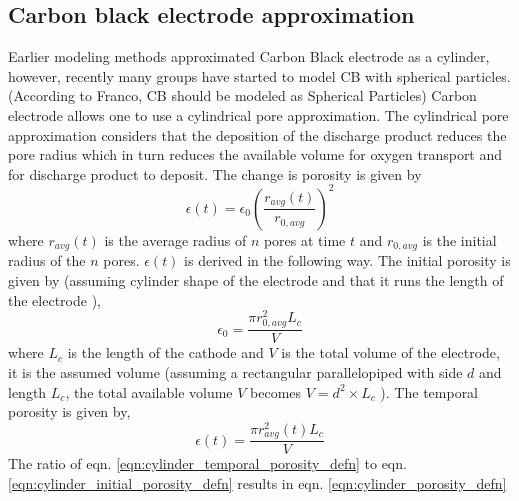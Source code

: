 \documentclass[12pt]{book}
\begin{document}
\subsection{Carbon black electrode approximation} Earlier modeling methods approximated Carbon Black electrode as a cylinder, however, recently many groups have started to model CB with spherical particles. \cite{Vamsci2014,Franco2013a}  (According to Franco, CB should be modeled as Spherical Particles) Carbon electrode allows one to use a cylindrical pore approximation. The cylindrical pore approximation considers that the deposition of the discharge product reduces the pore radius which in turn reduces the available volume for oxygen transport and for discharge product to deposit. The change is porosity is given by 
\begin{equation}
\epsilon\left(t\right)=\epsilon_0\left(\frac{r_{avg}\left(t\right)}{r_{0,avg}}\right)^2
\label{eqn:cylinder_porosity_defn}
\end{equation}
where $r_{avg}\left(t\right)$ is the average radius of $n$ pores at time $t$ and $r_{0,avg}$ is the initial radius of the $n$ pores. $\epsilon\left(t\right)$ is derived in the following way. The initial porosity is given by (assuming cylinder shape of the electrode and that it runs the length of the electrode ),
\begin{equation}
\epsilon_0 =\frac{\pi r^2_{0,avg}L_c}{V}
\label{eqn:cylinder_initial_porosity_defn}
\end{equation}
where $L_c$ is the length of the cathode and $V$ is the total volume of the electrode, it is the assumed volume (assuming a rectangular parallelopiped with side $d$ and length $L_c$, the total available volume $V$ becomes  $V=d^2\times L_c$ ).  The temporal porosity is given by,
\begin{equation}
\epsilon\left(t\right) =\frac{\pi r^2_{avg}\left(t\right)L_c}{V}
\label{eqn:cylinder_temporal_porosity_defn}
\end{equation}
The ratio of eqn. \ref{eqn:cylinder_temporal_porosity_defn} to eqn. \ref{eqn:cylinder_initial_porosity_defn} results in eqn. \ref{eqn:cylinder_porosity_defn}
\end{document}
